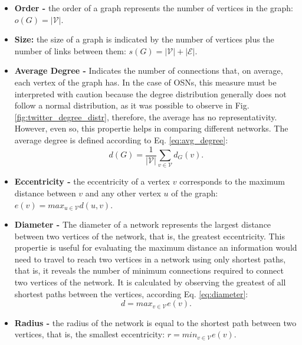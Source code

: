 \begin{itemize}
	\item \textbf{Order -} the order of a graph represents the number of vertices in the graph: $o(G) = |\mathcal{V}|$.
        	
    \item \textbf{Size:} the size of a graph is indicated by the number of vertices plus the number of links between them: $s(G) = |\mathcal{V}| + |\mathcal{E}|$.
        
    \item \textbf{Average Degree -} Indicates the number of connections that, on average, each vertex of the graph has. In the case of OSNs, this measure must be interpreted with caution because the degree distribution generally does not follow a normal distribution, as it was possible to observe in Fig. \ref{fig:twitter_degree_distr}, therefore, the average has no representativity. However, even so, this propertie helps in comparing different networks. The average degree is defined according to Eq. \ref{eq:avg_degree}:
    \begin{equation}
        \label{eq:avg_degree}
    	d(G) = \frac{1}{|\mathcal{V}|} \sum_{v \in \mathcal{V}}d_G(v).
    \end{equation}
        
	\item \textbf{Eccentricity -} the eccentricity of a vertex $v$ corresponds to the maximum distance between $v$ and any other vertex $u$ of the graph: $e(v) = max_{u \in \mathcal{V}}d(u,v)$.

    \item \textbf{Diameter -} The diameter of a network represents the largest distance between two vertices of the network, that is, the greatest eccentricity. This propertie is useful for evaluating the maximum distance an information would need to travel to reach two vertices in a network using only shortest paths, that is, it reveals the number of minimum connections required to connect two vertices of the network. It is calculated by observing the greatest of all shortest paths between the vertices, according Eq. \ref{eq:diameter}:
    	\begin{equation}
    	    \label{eq:diameter}
        	d = max_{v \in \mathcal{V}}e(v).
    	\end{equation}
        
    \item \textbf{Radius -} the radius of the network is equal to the shortest path between two vertices, that is, the smallest eccentricity: $r = min_{v \in \mathcal{V}}e(v)$.
            

\end{itemize}

